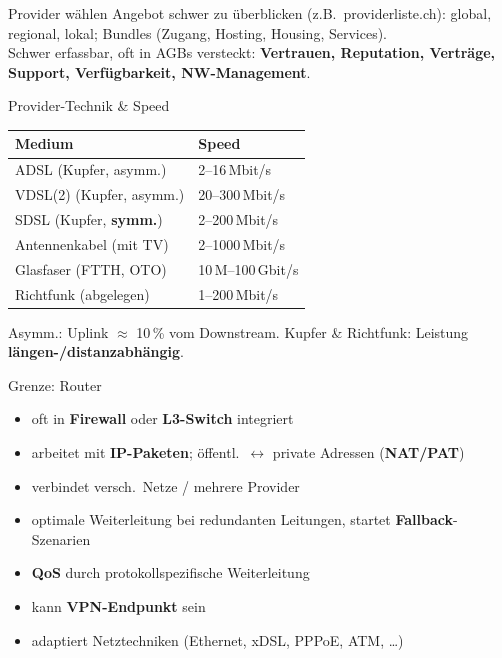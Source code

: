 \documentclass[a4paper, fontsize=7pt]{scrartcl}
\renewcommand*{\arraystretch}{1.5}  %
\begin{document}
\begin{subbox}{Provider wählen}
Angebot schwer zu überblicken (z.B.\ providerliste.ch): global, regional,
lokal; Bundles (Zugang, Hosting, Housing, Services).\\
Schwer erfassbar, oft in AGBs versteckt: \textbf{Vertrauen, Reputation,
Verträge, Support, Verfügbarkeit, NW-Management}.
\end{subbox}

\begin{mainbox}{Provider-Technik \& Speed}
\renewcommand*{\arraystretch}{1.15}
\begin{tabularx}{\linewidth}{@{}X|l@{}}
\textbf{Medium} & \textbf{Speed} \\
\hline
ADSL (Kupfer, asymm.) & 2--16\,Mbit/s \\
VDSL(2) (Kupfer, asymm.) & 20--300\,Mbit/s \\
SDSL (Kupfer, \textbf{symm.}) & 2--200\,Mbit/s \\
Antennenkabel (mit TV) & 2--1000\,Mbit/s \\
Glasfaser (FTTH, OTO) & 10\,M--100\,Gbit/s \\
Richtfunk (abgelegen) & 1--200\,Mbit/s \\
\end{tabularx}
Asymm.: Uplink $\approx$ 10\,\% vom Downstream. Kupfer \& Richtfunk:
Leistung \textbf{längen-/distanzabhängig}.
\end{mainbox}

\begin{mainbox}{Grenze: Router}
\begin{itemize}
    \item oft in \textbf{Firewall} oder \textbf{L3-Switch} integriert
    \item arbeitet mit \textbf{IP-Paketen}; öffentl.\ $\leftrightarrow$
          private Adressen (\textbf{NAT/PAT})
    \item verbindet versch.\ Netze / mehrere Provider
    \item optimale Weiterleitung bei redundanten Leitungen, startet
          \textbf{Fallback}-Szenarien
    \item \textbf{QoS} durch protokollspezifische Weiterleitung
    \item kann \textbf{VPN-Endpunkt} sein
    \item adaptiert Netztechniken (Ethernet, xDSL, PPPoE, ATM, \ldots)
\end{itemize}
\end{mainbox}
\end{document}
